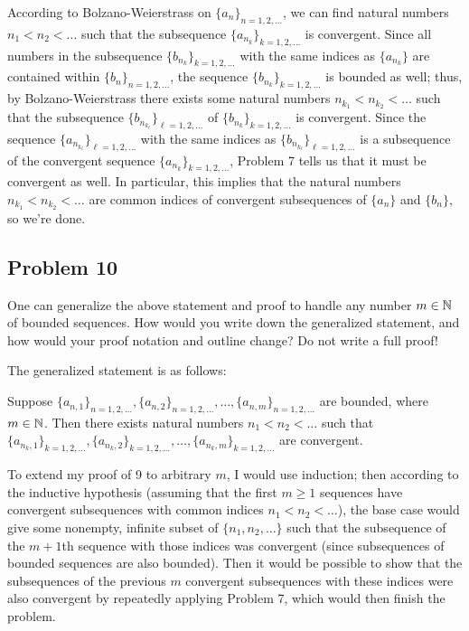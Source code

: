 \documentclass[main.tex]{subfiles}
\begin{document}
\begin{soln}
    According to Bolzano-Weierstrass on $\{a_n\}_{n = 1, 2, \ldots}$, we can find natural numbers $n_1 < n_2 < \ldots $ such that the subsequence $\{a_{n_k}\}_{k = 1, 2, \ldots}$ is convergent. Since all numbers in the subsequence $\{b_{n_k}\}_{k = 1, 2, \ldots}$ with the same indices as $\{a_{n_k}\}$ are contained within $\{b_n\}_{n = 1, 2, \ldots}$, the sequence $\{b_{n_k}\}_{k = 1, 2, \ldots}$ is bounded as well; thus, by Bolzano-Weierstrass there exists some natural numbers $n_{k_1} < n_{k_2} < \ldots$ such that the subsequence $\{b_{n_{k_\ell}}\}_{\ell = 1, 2, \ldots}$ of $\{b_{n_k}\}_{k = 1, 2, \ldots}$ is convergent. Since the sequence $\{a_{n_{k_\ell}}\}_{\ell = 1, 2, \ldots}$ with the same indices as $\{b_{n_{k_\ell}}\}_{\ell = 1, 2, \ldots}$ is a subsequence of the convergent sequence $\{a_{n_k}\}_{k = 1, 2, \ldots}$, Problem 7 tells us that it must be convergent as well. In particular, this implies that the natural numbers $n_{k_1} < n_{k_2} < \ldots$ are common indices of convergent subsequences of $\{a_n\}$ and $\{b_n\}$, so we're done.
\end{soln}
\eject

\subsection{Problem 10}
\begin{claim}
    One can generalize the above statement and proof to handle any number $m \in \mathbb N$ of bounded sequences. How would you write down the generalized statement, and how would your proof notation and outline change? Do not write a full proof!
\end{claim}

\begin{soln}
    The generalized statement is as follows:
    \begin{claim}
        Suppose $\{a_{n, 1}\}_{n = 1, 2, \ldots}, \{a_{n, 2}\}_{n = 1, 2, \ldots}, \ldots, \{a_{n, m}\}_{n = 1, 2, \ldots}$ are bounded, where $m\in \mathbb N$. Then there exists natural numbers $n_1 < n_2 < \ldots$ such that $\{a_{n_k, 1}\}_{k = 1, 2, \ldots}, \{a_{n_k, 2}\}_{k = 1, 2, \ldots}, \ldots , \{a_{n_k, m}\}_{k = 1, 2, \ldots}$ are convergent.
    \end{claim}

    To extend my proof of 9 to arbitrary $m$, I would use induction; then according to the inductive hypothesis (assuming that the first $m\ge 1$ sequences have convergent subsequences with common indices $n_1 < n_2 < \ldots $), the base case would give some nonempty, infinite subset of $\{n_1, n_2, \ldots\}$ such that the subsequence of the $m + 1$th sequence with those indices was convergent (since subsequences of bounded sequences are also bounded). Then it would be possible to show that the subsequences of the previous $m$ convergent subsequences with these indices were also convergent by repeatedly applying Problem 7, which would then finish the problem.
\end{soln}
\eject
\end{document}
